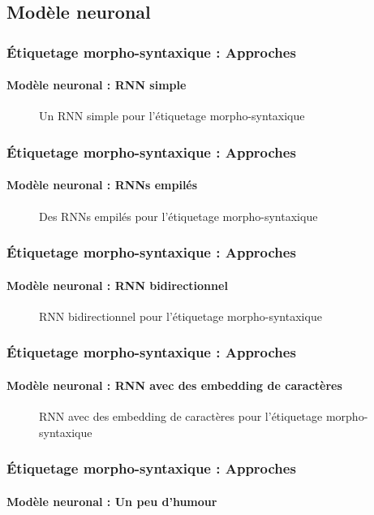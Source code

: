 \documentclass[xcolor=table]{beamer}
\begin{document}
\subsection{Modèle neuronal}

\begin{frame}
\frametitle{Étiquetage morpho-syntaxique : Approches}
\framesubtitle{Modèle neuronal : RNN simple}

\begin{figure}
	\centering
	\caption{Un RNN simple pour l'étiquetage morpho-syntaxique \cite{2019-jurafsky-martin}}
\end{figure}

\end{frame}

\begin{frame}
\frametitle{Étiquetage morpho-syntaxique : Approches}
\framesubtitle{Modèle neuronal : RNNs empilés}

\begin{figure}
	\centering
	\caption{Des RNNs empilés pour l'étiquetage morpho-syntaxique \cite{2019-jurafsky-martin}}
\end{figure}

\end{frame}

\begin{frame}
\frametitle{Étiquetage morpho-syntaxique : Approches}
\framesubtitle{Modèle neuronal : RNN bidirectionnel}

\begin{figure}
	\centering
	\caption{RNN bidirectionnel pour l'étiquetage morpho-syntaxique \cite{2019-jurafsky-martin}}
\end{figure}

\end{frame}

\begin{frame}
\frametitle{Étiquetage morpho-syntaxique : Approches}
\framesubtitle{Modèle neuronal : RNN avec des embedding de caractères}

\begin{figure}
	\centering
	\caption{RNN avec des embedding de caractères pour l'étiquetage morpho-syntaxique \cite{2019-jurafsky-martin}}
\end{figure}

\end{frame}

\begin{frame}
\frametitle{Étiquetage morpho-syntaxique : Approches}
\framesubtitle{Modèle neuronal : Un peu d'humour}

\begin{center}
\end{center}

\end{frame}

\end{document}
